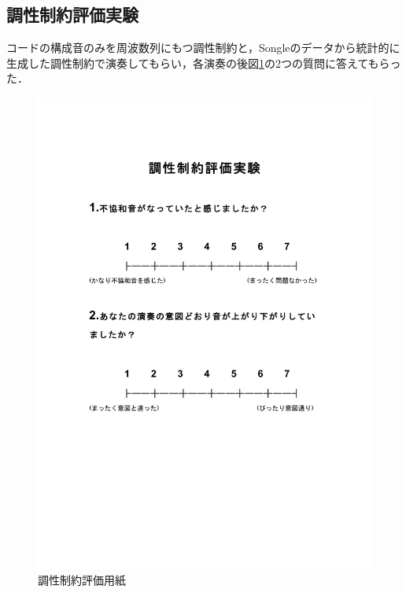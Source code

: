 \subsection{調性制約評価実験}
コードの構成音のみを周波数列にもつ調性制約と，Songleのデータから統計的に生成した調性制約で演奏してもらい，各演奏の後図\ref{img:eval2}の2つの質問に答えてもらった．
\begin{figure}[ht]
	\begin{center}
		\includegraphics[width=1.0\linewidth]{part/06.Evaluation/tonality.pdf}
		\caption{調性制約評価用紙}
		\label{img:eval2}
	\end{center}
\end{figure}
